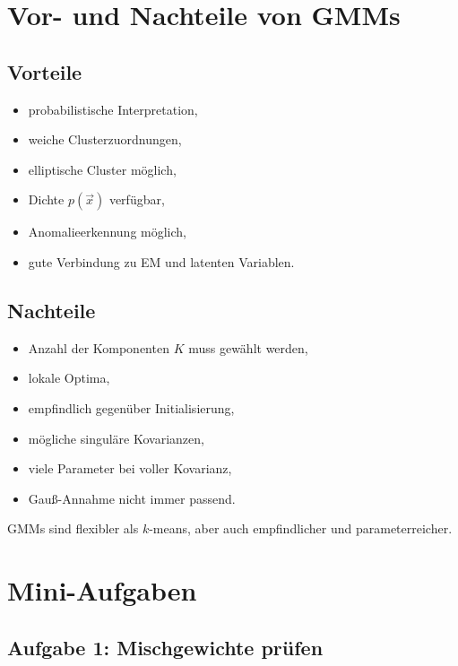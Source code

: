 \section{Vor- und Nachteile von GMMs}

\subsection{Vorteile}

\begin{itemize}
    \item probabilistische Interpretation,
    \item weiche Clusterzuordnungen,
    \item elliptische Cluster möglich,
    \item Dichte \(p(\vec{x})\) verfügbar,
    \item Anomalieerkennung möglich,
    \item gute Verbindung zu EM und latenten Variablen.
\end{itemize}

\subsection{Nachteile}

\begin{itemize}
    \item Anzahl der Komponenten \(K\) muss gewählt werden,
    \item lokale Optima,
    \item empfindlich gegenüber Initialisierung,
    \item mögliche singuläre Kovarianzen,
    \item viele Parameter bei voller Kovarianz,
    \item Gauß-Annahme nicht immer passend.
\end{itemize}

\begin{conceptbox}
GMMs sind flexibler als \(k\)-means, aber auch empfindlicher und parameterreicher.
\end{conceptbox}

\section{Mini-Aufgaben}

\subsection{Aufgabe 1: Mischgewichte prüfen}

